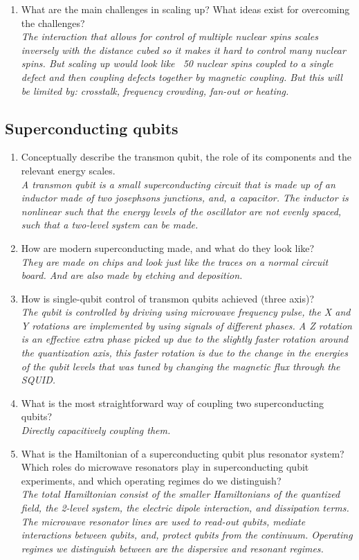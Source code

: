 \documentclass[a4paper]{scrartcl}
\newcommand{\qa}[2]{#1\\ \textit{#2}}
\begin{document}
\begin{enumerate}
  \item \qa{What are the main challenges in scaling up? What ideas exist for overcoming the challenges?}{The interaction that allows for control of multiple nuclear spins scales inversely with the distance cubed so it makes it hard to control many nuclear spins. But scaling up would look like ~50 nuclear spins coupled to a single defect and then coupling defects together by magnetic coupling. But this will be limited by: crosstalk, frequency crowding, fan-out or heating.}
\end{enumerate}

\subsection*{Superconducting qubits}
\begin{enumerate}
  \item \qa{Conceptually describe the transmon qubit, the role of its components and the relevant energy scales.}{A transmon qubit is a small superconducting circuit that is made up of an inductor made of two josephsons junctions, and, a capacitor. The inductor is nonlinear such that the energy levels of the oscillator are not evenly spaced, such that a two-level system can be made.}
  \item \qa{How are modern superconducting made, and what do they look like?}{They are made on chips and look just like the traces on a normal circuit board. And are also made by etching and deposition.}
  \item \qa{How is single-qubit control of transmon qubits achieved (three axis)?}{The qubit is controlled by driving using microwave frequency pulse, the X and Y rotations are implemented by using signals of different phases. A Z rotation is an effective extra phase picked up due to the slightly faster rotation around the quantization axis, this faster rotation is due to the change in the energies of the qubit levels that was tuned by changing the magnetic flux through the SQUID.}
  \item \qa{What is the most straightforward way of coupling two superconducting qubits?}{Directly capacitively coupling them.}
  \item \qa{What is the Hamiltonian of a superconducting qubit plus resonator system? Which roles do microwave resonators play in superconducting qubit experiments, and which operating regimes do we distinguish?}{The total Hamiltonian consist of the smaller Hamiltonians of the quantized field, the 2-level system, the electric dipole interaction, and dissipation terms. The microwave resonator lines are used to read-out qubits, mediate interactions between qubits, and, protect qubits from the continuum. Operating regimes we distinguish between are the dispersive and resonant regimes.}

\end{enumerate}
\end{document}
